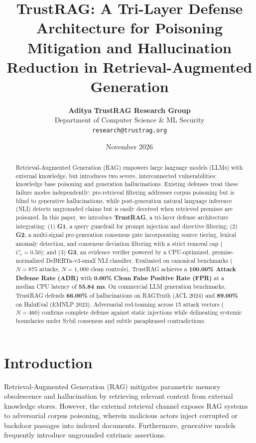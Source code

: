 \documentclass[11pt,a4paper]{article}
\title{\textbf{TrustRAG: A Tri-Layer Defense Architecture for Poisoning Mitigation and Hallucination Reduction in Retrieval-Augmented Generation}}
\author{
  \textbf{Aditya} \quad \textbf{TrustRAG Research Group} \\
  Department of Computer Science \& ML Security \\
  \texttt{research@trustrag.org}
}
\date{November 2026}
\begin{document}
\maketitle

\begin{abstract}
Retrieval-Augmented Generation (RAG) empowers large language models (LLMs) with external knowledge, but introduces two severe, interconnected vulnerabilities: knowledge base poisoning and generation hallucinations. Existing defenses treat these failure modes independently: pre-retrieval filtering addresses corpus poisoning but is blind to generative hallucinations, while post-generation natural language inference (NLI) detects ungrounded claims but is easily deceived when retrieved premises are poisoned. In this paper, we introduce \textbf{TrustRAG}, a tri-layer defense architecture integrating: (1) \textbf{G1}, a query guardrail for prompt injection and directive filtering; (2) \textbf{G2}, a multi-signal pre-generation consensus gate incorporating source tiering, lexical anomaly detection, and consensus deviation filtering with a strict removal cap ($C_r = 0.50$); and (3) \textbf{G3}, an evidence verifier powered by a CPU-optimized, premise-normalized DeBERTa-v3-small NLI classifier. Evaluated on canonical benchmarks ($N=875$ attacks, $N=1,000$ clean controls), TrustRAG achieves a \textbf{100.00\% Attack Defense Rate (ADR)} with \textbf{0.00\% Clean False Positive Rate (FPR)} at a median CPU latency of \textbf{55.84 ms}. On commercial LLM generation benchmarks, TrustRAG defends \textbf{66.00\%} of hallucinations on RAGTruth (ACL 2024) and \textbf{89.00\%} on HaluEval (EMNLP 2023). Adversarial red-teaming across 15 attack vectors ($N=460$) confirms complete defense against static injections while delineating systemic boundaries under Sybil consensus and subtle paraphrased contradictions.
\end{abstract}

\section{Introduction}
Retrieval-Augmented Generation (RAG) mitigates parametric memory obsolescence and hallucination by retrieving relevant context from external knowledge stores. However, the external retrieval channel exposes RAG systems to adversarial corpus poisoning, wherein malicious actors inject corrupted or backdoor passages into indexed documents. Furthermore, generative models frequently introduce ungrounded extrinsic assertions.
\end{document}

